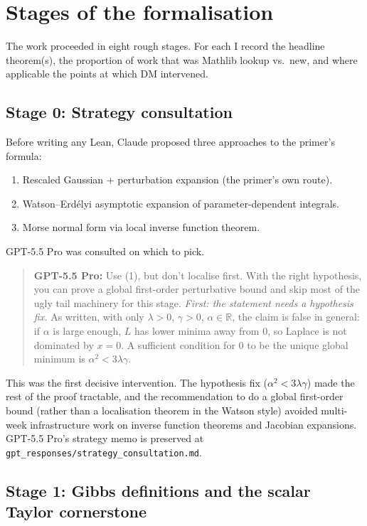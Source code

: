 \documentclass[11pt]{article}
\newcommand{\gptbox}[1]{\par\medskip\begin{quote}\small\textbf{\textcolor{green!50!black}{GPT-5.5 Pro:}} #1\end{quote}\medskip}
\begin{document}
\section{Stages of the formalisation}

The work proceeded in eight rough stages. For each I record the headline
theorem(s), the proportion of work that was Mathlib lookup vs.\ new, and
where applicable the points at which DM intervened.

\subsection{Stage 0: Strategy consultation}\label{sec:strategy}

Before writing any Lean, Claude proposed three approaches to the primer's
formula:

\begin{enumerate}
\item Rescaled Gaussian + perturbation expansion (the primer's own route).
\item Watson--Erd\'elyi asymptotic expansion of parameter-dependent
integrals.
\item Morse normal form via local inverse function theorem.
\end{enumerate}

GPT-5.5 Pro was consulted on which to pick.

\gptbox{Use (1), but don't localise first. With the right hypothesis, you
can prove a global first-order perturbative bound and skip most of the
ugly tail machinery for this stage. \emph{First: the statement needs a
hypothesis fix.} As written, with only $\lambda > 0$, $\gamma > 0$,
$\alpha \in \mathbb R$, the claim is false in general: if $\alpha$ is
large enough, $L$ has lower minima away from $0$, so Laplace is not
dominated by $x = 0$. A sufficient condition for $0$ to be the unique
global minimum is $\alpha^2 < 3\lambda\gamma$.}

This was the first decisive intervention. The hypothesis fix
($\alpha^2 < 3\lambda\gamma$) made the rest of the proof tractable, and
the recommendation to do a global first-order bound (rather than a
localisation theorem in the Watson style) avoided multi-week
infrastructure work on inverse function theorems and Jacobian expansions.
GPT-5.5 Pro's strategy memo is preserved at
\texttt{gpt\_responses/strategy\_consultation.md}.

\subsection{Stage 1: Gibbs definitions and the scalar Taylor cornerstone}
\end{document}
